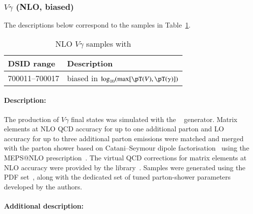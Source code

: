 



\subsubsection[Vgamma (NLO, biased)]{$V\gamma$ (NLO, biased)}

The descriptions below correspond to the samples in
Table~\ref{tab:MB-sherpa-vynlo-ew}.

\begin{table}[htbp]
  \begin{center}
    \caption{NLO $V\gamma$ samples with \SHERPA}
    \label{tab:MB-sherpa-vynlo-ew}
    \begin{tabular}{ l | l }
      \hline
      DSID range & Description \\
      \hline
      700011--700017   & biased in $\log_{10}(\max[\pT(V), \pT(\gamma)])$\\
      \hline
    \end{tabular}
  \end{center}
\end{table}

\paragraph{Description:}

The production of $V\gamma$ final states was simulated with the
\SHERPA[2.2.8]~\cite{Bothmann:2019yzt} generator.  Matrix elements at
NLO QCD accuracy for up to one additional parton and LO accuracy for
up to three additional parton emissions were matched and merged with
the \SHERPA parton shower based on Catani--Seymour
dipole factorisation~\cite{Gleisberg:2008fv,Schumann:2007mg} using the MEPS@NLO
prescription~\cite{Hoeche:2011fd,Hoeche:2012yf,Catani:2001cc,Hoeche:2009rj}.
The virtual QCD corrections for matrix elements at NLO accuracy were provided by 
the \OPENLOOPS[2] library~\cite{Buccioni:2019sur,Cascioli:2011va,Buccioni:2017yxi,Denner:2016kdg}.
Samples were generated using the \NNPDF[3.0nnlo] PDF set~\cite{Ball:2014uwa}, along with
the dedicated set of tuned parton-shower parameters developed by the \SHERPA authors.


\paragraph{Additional description:}

